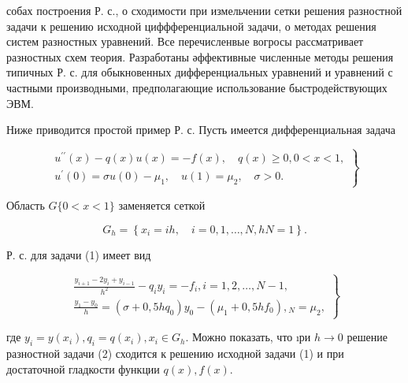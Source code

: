 \documentclass[10pt]{article}
\begin{document}
собах построения Р. с., о сходимости при измельчении сетки решения разностной задачи к решению исходной циффференциальной задачи, о методах решения систем разностных уравнений. Все перечисленвые вогросы рассматривает разностных схем теория. Разработаны әффективные численные методы решения типичных Р. с. для обыкновенных дифференциальных уравнений и уравнений с частными производными, предполагающие использование быстродействующих ЭВМ.



Ниже приводится простой пример Р. с. Пусть имеется дифференциальная задача



\[

\left.\begin{array}{c}

u^{\prime \prime}(x)-q(x) u(x)=-f(x), \quad q(x) \geqslant 0,0<x<1, \\

u^{\prime}(0)=\sigma u(0)-\mu_{1}, \quad u(1)=\mu_{2}, \quad \sigma>0 .

\end{array}\right\}

\]



Область $G\{0<x<1\}$ заменяется сеткой



\[

G_{h}=\left\{x_{i}=i h, \quad i=0,1, \ldots, N, h N=1\right\} .

\]



Р. с. для задачи (1) имеет вид



\[

\left.\begin{array}{c}

\frac{y_{i+1}-2 y_{i}+y_{i-1}}{h^{2}}-q_{i} y_{i}=-f_{i}, i=1,2, \ldots, N-1, \\

\frac{y_{1}-y_{0}}{h}=\left(\sigma+0,5 h q_{0}\right) y_{0}-\left(\mu_{1}+0,5 h f_{0}\right),{ }_{N}=\mu_{2},

\end{array}\right\}

\]



где $y_{i}=y\left(x_{i}\right), q_{i}=q\left(x_{i}\right), x_{i} \in G_{h}$. Можно показать, что ıри $h \rightarrow 0$ решение разностной задачи (2) сходится к решению исходной задачи (1) и при достаточной гладкости функции $q(x), f(x)$.
\end{document}
